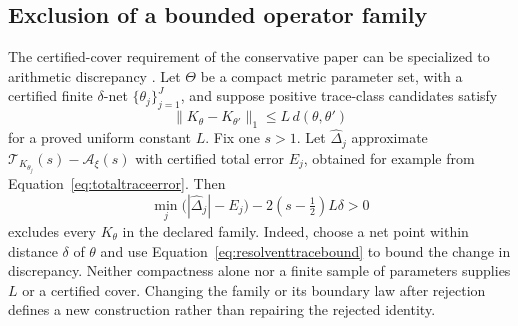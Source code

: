 \documentclass[11pt,letterpaper]{article}
\numberwithin{equation}{section}
\theoremstyle{definition}
\theoremstyle{remark}
\begin{document}
\subsection{Exclusion of a bounded operator family}
\label{subsec:operatorfamily}
The certified-cover requirement of the conservative paper can be specialized to arithmetic discrepancy \cite{tcgsconservative}. Let $\Theta$ be a compact metric parameter set, with a certified finite $\delta$-net $\{\theta_j\}_{j=1}^{J}$, and suppose positive trace-class candidates satisfy
\begin{equation}
 \|K_\theta-K_{\theta'}\|_1\leq L\,d(\theta,\theta')
 \label{eq:familylipschitz}
\end{equation}
for a proved uniform constant $L$. Fix one $s>1$. Let $\widehat\Delta_j$ approximate $\mathcal T_{K_{\theta_j}}(s)-\mathcal A_\xi(s)$ with certified total error $E_j$, obtained for example from Equation~\eqref{eq:totaltraceerror}. Then
\begin{equation}
 \min_j\bigl(|\widehat\Delta_j|-E_j\bigr)
       -2(s-\tfrac12)L\delta>0
 \label{eq:familyrejection}
\end{equation}
excludes every $K_\theta$ in the declared family. Indeed, choose a net point within distance $\delta$ of $\theta$ and use Equation~\eqref{eq:resolventtracebound} to bound the change in discrepancy. Neither compactness alone nor a finite sample of parameters supplies $L$ or a certified cover. Changing the family or its boundary law after rejection defines a new construction rather than repairing the rejected identity.
\end{document}
